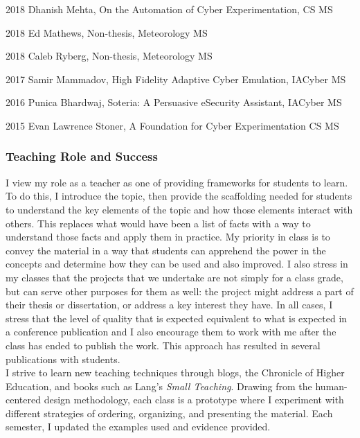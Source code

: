 \documentclass[12pt,letterpaper]{report}
\newcommand{\listitemspace}{0.25em}
\renewenvironment{itemize}
{\begin{list}{}{\setlength{\leftmargin}{0em}
                \setlength{\parskip}{0em}
                \setlength{\itemsep}{\listitemspace}
                \setlength{\parsep}{\listitemspace}}}
{\end{list}}
\begin{document}
\begin{itemize}
    \item 2018 Dhanish Mehta, On the Automation of Cyber Experimentation, CS MS
    \item 2018 Ed Mathews, Non-thesis, Meteorology MS
    \item 2018 Caleb Ryberg, Non-thesis, Meteorology MS
    \item 2017 Samir Mammadov, High Fidelity Adaptive Cyber Emulation, IACyber MS
    \item 2016 Punica Bhardwaj, Soteria: A Persuasive eSecurity Assistant, IACyber MS
    \item 2015 Evan Lawrence Stoner, A Foundation for Cyber Experimentation CS MS

    \end{itemize}


\subsubsection*{Teaching Role and Success}

I view my role as a teacher as one of providing frameworks for students to learn.  To do this, I introduce the topic, then provide the scaffolding needed for students to understand the key elements of the topic and how those elements interact with others.  This replaces what would have been a list of facts with a way to understand those facts and apply them in practice.   My priority in class is to convey the material in a way that students can apprehend the power in the concepts and determine how they can be used and also improved.  I also stress in my classes that the projects that we undertake are not simply for a class grade, but can serve other purposes for them as well: the project might address a part of their thesis or dissertation, or address a key interest they have.  In all cases, I stress that the level of quality that is expected equivalent to what is expected in a conference publication and I also encourage them to work with me after the class has ended to publish the work.    This approach has resulted in several publications with students.\\

I strive to learn new teaching techniques through blogs, the Chronicle of Higher Education, and books such as Lang's \textit{Small Teaching}.   Drawing from the human-centered design methodology, each class is a prototype where I experiment with different strategies of ordering, organizing, and presenting the material.    Each semester, I updated the examples used and evidence provided. 
\end{document}
